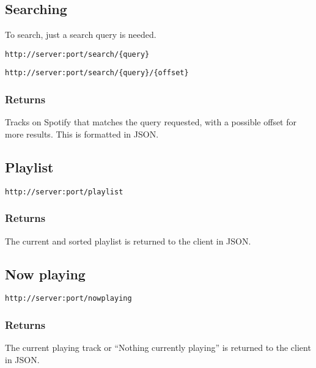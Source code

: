 \subsection{Searching}
To search, just a search query is needed.

\begin{lstlisting}[label={lst:endpoint_search}, caption={Text surrounded by curly brackets are parameters.}]
http://server:port/search/{query}
\end{lstlisting}

\begin{lstlisting}[label={lst:endpoint_search_offset}, caption={Text surrounded by curly brackets are parameters.}]
http://server:port/search/{query}/{offset}
\end{lstlisting}

\subsubsection{Returns}
Tracks on Spotify that matches the query requested, with a possible offset for more results. This is formatted in JSON.

\subsection{Playlist}

\begin{lstlisting}[label={lst:endpoint_playlist}, caption={Text surrounded by curly brackets are parameters.}]
http://server:port/playlist
\end{lstlisting}

\subsubsection{Returns}
The current and sorted playlist is returned to the client in JSON.

\subsection{Now playing}

\begin{lstlisting}[label={lst:endpoint_nowplaying}, caption={Text surrounded by curly brackets are parameters.}]
http://server:port/nowplaying
\end{lstlisting}

\subsubsection{Returns}
The current playing track or \enquote{Nothing currently playing} is returned to the client in JSON.

